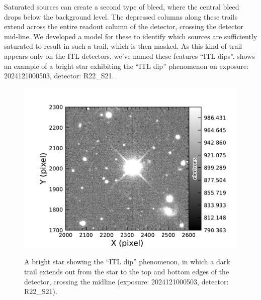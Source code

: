 Saturated sources can create a second type of bleed, where the central bleed drops below the background level.
The depressed columns along these trails extend across the entire readout column of the detector, crossing the detector mid-line.
We developed a model for these to identify which sources are sufficiently saturated to result in such a trail, which is then masked.  As this kind of trail appears only on the ITL detectors, we've named these features ``ITL dips''.
 shows an example of a   bright star exhibiting the ``ITL dip'' phenomenon on exposure: 2024121000503, detector: R22\_S21.

\begin{figure}[htb!]
  \centering
  \includegraphics[width=0.98\linewidth]{figures/dp1_isr_anomalies-itl_dip.pdf}
  \label{fig:anomalies_itl_dip}
  \caption{
    A bright star showing the ``ITL dip'' phenomenon, in which a dark trail extends out from the star to the top and bottom edges of the detector, crossing the midline (exposure: 2024121000503, detector: R22\_S21).
  }
\end{figure}

